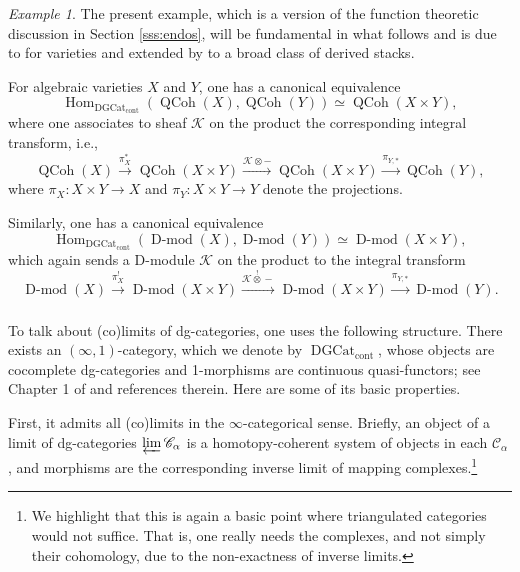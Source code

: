 \documentclass[10pt]{amsart}
\newcommand{\on}{\operatorname}
\newcommand{\Dmod}{\on{D-mod}}
\theoremstyle{remark}
\newtheorem{ex}[subsubsection]{Example}
\newcommand{\Hom}{\operatorname{Hom}}
\numberwithin{equation}{section}
\newcommand{\sC}{\mathscr{C}}
\newcommand{\msf}{\operatorname}
\newcommand{\QCoh}{\on{QCoh}}
\newcommand{\DGCat}{\msf{DGCat}_{\on{cont}}}
\begin{document}
\begin{ex}The present example, which is a version of the function theoretic discussion in Section \ref{sss:endos}, will be fundamental in what follows and is due to \cite{toenpaper} for varieties and  extended by \cite{benzvifrancisnadler} to a broad class of derived stacks.   






For algebraic varieties $X$ and $Y$, one has a canonical equivalence 
%
\[
   \Hom_{\DGCat}(\QCoh(X), \QCoh(Y)) \simeq \QCoh(X \times Y),
\]
%
where one associates to sheaf $\mathscr{K}$ on the product the corresponding integral transform, i.e., 
%
\[
   \QCoh(X) \xrightarrow{\pi_X^*} \QCoh(X \times Y) \xrightarrow{\mathscr{K} \otimes - } \QCoh(X \times Y) \xrightarrow{\pi_{Y, *}} \QCoh(Y), 
\]
%
where $\pi_X: X \times Y \rightarrow X$ and $\pi_Y: X \times Y \rightarrow Y$ denote the projections. 

Similarly, one has a canonical equivalence 
%
\[
   \Hom_{\DGCat}(\Dmod(X), \Dmod(Y)) \simeq \Dmod(X \times Y),
\]
%
which again sends a D-module $\mathscr{K}$ on the product to the integral transform 
%
\[
   \Dmod(X) \xrightarrow{\pi_X^!} \Dmod(X \times Y) \xrightarrow{ \mathscr{K} \overset ! \otimes - } \Dmod(X \times Y) \xrightarrow{\pi_{Y, *}} \Dmod(Y). 
\]
%
\end{ex}




\subsubsection{}\label{s:dgcat} To talk about (co)limits of 
dg-categories, one uses the following structure. There exists an $(\infty, 
1)$-category, which we denote by $\DGCat$, whose objects are 
cocomplete dg-categories and 1-morphisms are continuous quasi-functors; see Chapter 1 of \cite{gaitsroz} and references therein. Here are 
some of its basic properties. 

First, it admits all (co)limits in the 
$\infty$-categorical sense. Briefly, an object of a limit of dg-categories 
$\varprojlim \sC_\alpha$ is a homotopy-coherent system of objects in each 
$\sC_\alpha$, and morphisms are the corresponding inverse limit of mapping 
complexes.\footnote{We highlight that this is again a basic point where 
triangulated 
categories would not suffice. That is, one really needs the complexes, and not 
simply their cohomology, due to the non-exactness of inverse limits.} 
\end{document}
